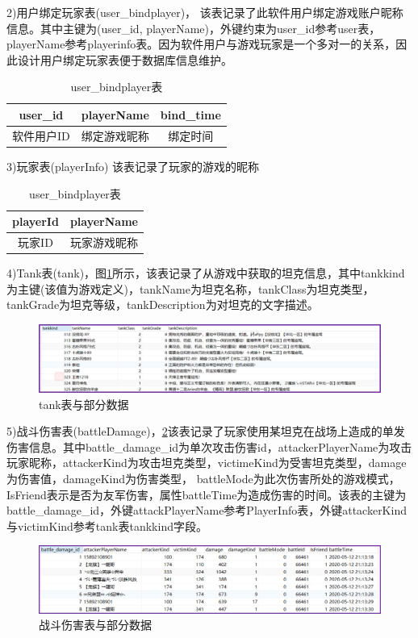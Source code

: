 \documentclass[UTF8, a4paper]{ctexart}
\begin{document}
2)用户绑定玩家表(user\_bindplayer)，
该表记录了此软件用户绑定游戏账户昵称信息。其中主键为(user\_id, playerName)，外键约束为user\_id参考user表，
playerName参考playerinfo表。因为软件用户与游戏玩家是一个多对一的关系，因此设计用户绑定玩家表便于数据库信息维护。
\begin{table}[H]
\centering
\caption{user\_bindplayer表}\label{tab:userbind}
\begin{tabular}{|c|c|c|}\hline
user\_id&playerName&bind\_time\\\hline
软件用户ID&绑定游戏昵称&绑定时间\\\hline
\end{tabular}
\end{table}

3)玩家表(playerInfo)
该表记录了玩家的游戏的昵称
\begin{table}[H]
\centering
\caption{user\_bindplayer表}\label{tab:userbind}
\begin{tabular}{|c|c|}\hline
playerId&playerName\\\hline
玩家ID&玩家游戏昵称\\\hline
\end{tabular}
\end{table}

4)Tank表(tank)，图\ref{fig:tank}所示，该表记录了从游戏中获取的坦克信息，其中tankkind为主键(该值为游戏定义)，tankName为坦克名称，tankClass为坦克类型，tankGrade为坦克等级，tankDescription为对坦克的文字描述。

 \begin{figure}[h]
    \centering
    \includegraphics[width=1\textwidth]{tank.png}
    \caption{tank表与部分数据}
    \label{fig:tank}
  \end{figure}

5)战斗伤害表(battleDamage)，\ref{fig:damage}该表记录了玩家使用某坦克在战场上造成的单发伤害信息。其中battle\_damage\_id为单次攻击伤害id，attackerPlayerName为攻击玩家昵称，attackerKind为攻击坦克类型，victimeKind为受害坦克类型，damage为伤害值，damageKind为伤害类型，
battleMode为此次伤害所处的游戏模式，IsFriend表示是否为友军伤害，属性battleTime为造成伤害的时间。该表的主键为battle\_damage\_id，外键attackPlayerName参考PlayerInfo表，外键attackerKind与victimKind参考tank表tankkind字段。
 \begin{figure}[h]
    \centering
    \includegraphics[width=1\textwidth]{damage.png}
    \caption{战斗伤害表与部分数据}
    \label{fig:damage}
  \end{figure}
\end{document}

